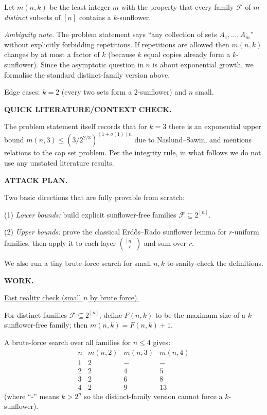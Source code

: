 Let $m(n,k)$ be the least integer $m$ with the property that every family $\mathcal F$ of $m$ \emph{distinct} subsets of $[n]$ contains a $k$-sunflower.

\emph{Ambiguity note.} The problem statement says ``any collection of sets $A_1,\dots,A_m$'' without explicitly forbidding repetitions. If repetitions are allowed then $m(n,k)$ changes by at most a factor of $k$ (because $k$ equal copies already form a $k$-sunflower). Since the asymptotic question in $n$ is about exponential growth, we formalise the standard distinct-family version above.

Edge cases: $k=2$ (every two sets form a $2$-sunflower) and $n$ small.

\medskip
\noindent\textbf{QUICK LITERATURE/CONTEXT CHECK.}

The problem statement itself records that for $k=3$ there is an exponential upper bound $m(n,3) \le (3/2^{2/3})^{(1+o(1))n}$ due to Naslund--Sawin, and mentions relations to the cap set problem. Per the integrity rule, in what follows we do not use any unstated literature results.

\medskip
\noindent\textbf{ATTACK PLAN.}

Two basic directions that are fully provable from scratch:

(1) \emph{Lower bounds:} build explicit sunflower-free families $\mathcal F\subseteq 2^{[n]}$.

(2) \emph{Upper bounds:} prove the classical Erd\H{o}s--Rado sunflower lemma for $r$-uniform families, then apply it to each layer $\binom{[n]}{r}$ and sum over $r$.

We also run a tiny brute-force search for small $n,k$ to sanity-check the definitions.

\medskip
\noindent\textbf{WORK.}

\medskip
\noindent\underline{Fast reality check (small $n$ by brute force).}

For distinct families $\mathcal F\subseteq 2^{[n]}$, define $F(n,k)$ to be the maximum size of a $k$-sunflower-free family; then $m(n,k)=F(n,k)+1$.

A brute-force search over all families for $n\le 4$ gives:
\[
\begin{array}{c|ccc}
 n & m(n,2) & m(n,3) & m(n,4) \\\hline
 1 & 2 & - & - \\
 2 & 2 & 4 & 5 \\
 3 & 2 & 6 & 8 \\
 4 & 2 & 9 & 13
\end{array}
\]
(where ``-'' means $k>2^n$ so the distinct-family version cannot force a $k$-sunflower).

